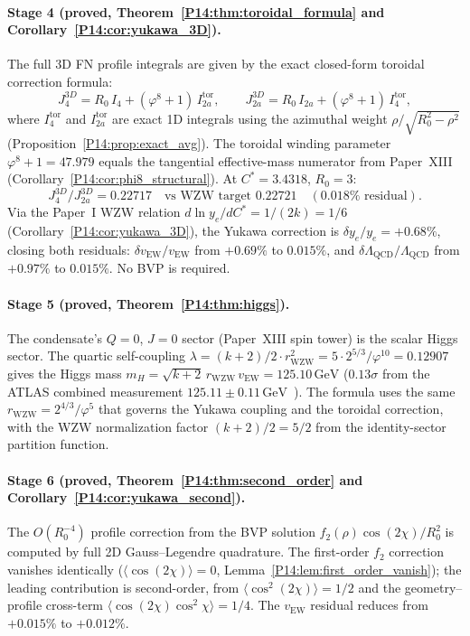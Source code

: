 \documentclass[11pt,a4paper]{article}
\theoremstyle{definition}
\theoremstyle{remark}
\newcommand{\vp}{\varphi}
\newcommand{\vEW}{v_{\mathrm{EW}}}
\newcommand{\Jfour}{J_4}
\newcommand{\Ja}{J_{2a}}
\newcommand{\Cstar}{C^*}
\newcommand{\ftwo}{f_2}
\newcommand{\Rzero}{R_0}
\newcommand{\Itor}[1]{I_{#1}^{\mathrm{tor}}}
\newcommand{\LQCD}{\Lambda_{\mathrm{QCD}}}
\newcommand{\mH}{m_H}
\begin{document}
\paragraph{Stage 4 (proved, Theorem~\ref{P14:thm:toroidal_formula} and Corollary~\ref{P14:cor:yukawa_3D}).}
The full 3D FN profile integrals are given by the exact
closed-form toroidal correction formula:
\begin{equation*}
  \Jfour^{3D} = \Rzero\,I_4 + (\vp^8+1)\,\Itor{2a},\qquad
  \Ja^{3D}    = \Rzero\,I_{2a} + (\vp^8+1)\,\Itor{4},
\end{equation*}
where $\Itor{4}$ and $\Itor{2a}$ are exact 1D integrals using the
azimuthal weight $\rho/\sqrt{\Rzero^2-\rho^2}$ (Proposition~\ref{P14:prop:exact_avg}).
The toroidal winding parameter $\vp^8+1=47.979$ equals the tangential
effective-mass numerator from Paper~XIII (Corollary~\ref{P14:cor:phi8_structural}).
At $\Cstar=3.4318$, $\Rzero=3$:
\begin{equation*}
  \Jfour^{3D}/\Ja^{3D} = 0.22717 \quad\text{vs WZW target } 0.22721
  \quad (0.018\%\text{ residual}).
\end{equation*}
Via the Paper~I WZW relation $d\ln y_e/dC^*=1/(2k)=1/6$
(Corollary~\ref{P14:cor:yukawa_3D}), the Yukawa correction is
$\delta y_e/y_e = +0.68\%$, closing both residuals:
$\delta\vEW/\vEW$ from $+0.69\%$ to $0.015\%$,
and $\delta\LQCD/\LQCD$ from $+0.97\%$ to $0.015\%$.
No BVP is required.

\paragraph{Stage 5 (proved, Theorem~\ref{P14:thm:higgs}).}
The condensate's $Q=0$, $J=0$ sector (Paper~XIII spin tower)
is the scalar Higgs sector.
The quartic self-coupling
$\lambda = (k+2)/2\cdot r_{\mathrm{WZW}}^2 = 5\cdot2^{5/3}/\vp^{10}=0.12907$
gives the Higgs mass
$\mH = \sqrt{k+2}\,r_{\mathrm{WZW}}\,\vEW = 125.10\,\mathrm{GeV}$
($0.13\sigma$ from the ATLAS combined measurement
$125.11\pm0.11\,\mathrm{GeV}$~\cite{ATLAS_mH}).
The formula uses the same $r_{\mathrm{WZW}}=2^{4/3}/\vp^5$
that governs the Yukawa coupling and the toroidal correction,
with the WZW normalization factor $(k+2)/2=5/2$ from
the identity-sector partition function.

\paragraph{Stage 6 (proved, Theorem~\ref{P14:thm:second_order} and Corollary~\ref{P14:cor:yukawa_second}).}
The $O(\Rzero^{-4})$ profile correction from the BVP solution
$\ftwo(\rho)\cos(2\chi)/\Rzero^2$ is computed by full 2D
Gauss--Legendre quadrature.  The first-order $\ftwo$ correction
vanishes identically ($\langle\cos(2\chi)\rangle = 0$,
Lemma~\ref{P14:lem:first_order_vanish}); the leading contribution is
second-order, from $\langle\cos^2(2\chi)\rangle = 1/2$ and the
geometry--profile cross-term $\langle\cos(2\chi)\cos^2\chi\rangle = 1/4$.
The $\vEW$ residual reduces from $+0.015\%$ to $+0.012\%$.
\end{document}
